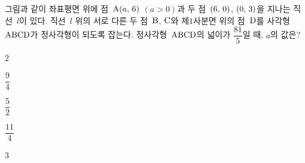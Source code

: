 \noindent\begin{minipage}[t]{0.58\linewidth}\vspace{0pt}\raggedright 그림과 같이 좌표평면 위에 점~$\mathrm{A}(a,\mkern3mu 6)$ $(a>0)$과 두 점~$(6,\mkern3mu 0)$, $(0,\mkern3mu 3)$을 지나는 직선~$l$이 있다. 직선~$l$ 위의 서로 다른 두 점~$\mathrm{B}$, $\mathrm{C}$와 제$1$사분면 위의 점~$\mathrm{D}$를 사각형~$\mathrm{ABCD}$가 정사각형이 되도록 잡는다. 정사각형~$\mathrm{ABCD}$의 넓이가 $\dfrac{81}{5}$일 때, $a$의 값은?\end{minipage}\hfill\begin{minipage}[t]{0.4\linewidth}\vspace{0pt}\centering \resizebox{\ifdim\width>\linewidth\linewidth\else\width\fi}{!}{}\end{minipage}\par
\begin{choices32}{\rule[-3ex]{0pt}{8ex}$2$}{\rule[-3ex]{0pt}{8ex}$\dfrac{9}{4}$}{\rule[-3ex]{0pt}{8ex}$\dfrac{5}{2}$}{\rule[-3ex]{0pt}{8ex}$\dfrac{11}{4}$}{\rule[-3ex]{0pt}{8ex}$3$}\end{choices32}
